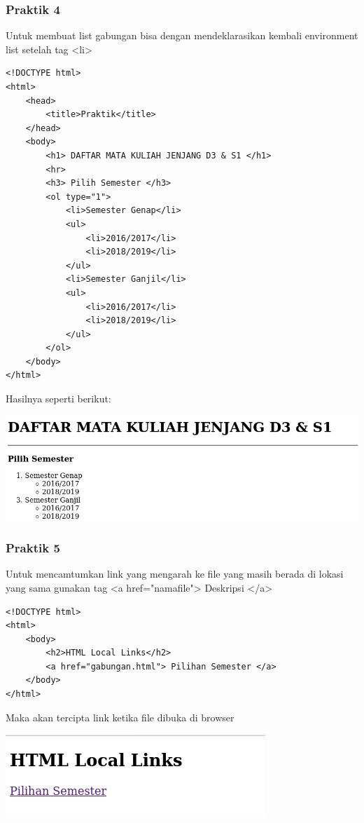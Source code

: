 \documentclass[a4paper,12pt]{article}
\begin{document}
\subsubsection{Praktik 4}
Untuk membuat list gabungan bisa dengan mendeklarasikan kembali environment list setelah tag <li>
\begin{lstlisting}
<!DOCTYPE html>
<html>
    <head>
        <title>Praktik</title>
    </head>
    <body>
        <h1> DAFTAR MATA KULIAH JENJANG D3 & S1 </h1>
        <hr>
        <h3> Pilih Semester </h3>
        <ol type="1">
            <li>Semester Genap</li>
            <ul>
                <li>2016/2017</li>
                <li>2018/2019</li>
            </ul>
            <li>Semester Ganjil</li>
            <ul>
                <li>2016/2017</li>
                <li>2018/2019</li>
            </ul>
        </ol>
    </body>
</html>
\end{lstlisting}
Hasilnya seperti berikut:\\
\begin{center}
    \includegraphics[width=\linewidth]{5.png}
\end{center}

\subsubsection{Praktik 5}
Untuk mencamtumkan link yang mengarah ke file yang masih berada di lokasi yang sama gunakan tag <a href="namafile"> Deskripsi </a>
\begin{lstlisting}
<!DOCTYPE html>
<html>
    <body>
        <h2>HTML Local Links</h2>
        <a href="gabungan.html"> Pilihan Semester </a>
    </body>
</html>
\end{lstlisting}
Maka akan tercipta link ketika file dibuka di browser
\begin{center}
    \includegraphics[width=\linewidth]{6.png}
\end{center}
\end{document}

